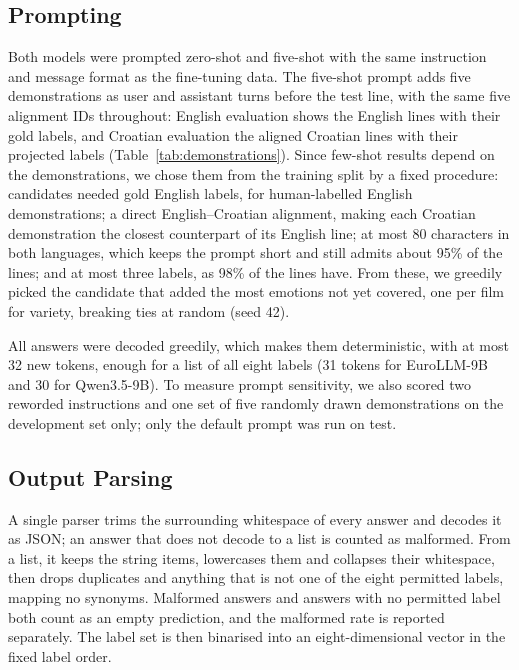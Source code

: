 \subsection{Prompting}
\label{sec:methodology_prompting}

Both models were prompted zero-shot and five-shot with the same instruction and message format as the fine-tuning data. The five-shot prompt adds five demonstrations as user and assistant turns before the test line, with the same five alignment IDs throughout: English evaluation shows the English lines with their gold labels, and Croatian evaluation the aligned Croatian lines with their projected labels (Table~\ref{tab:demonstrations}). Since few-shot results depend on the demonstrations, we chose them from the training split by a fixed procedure: candidates needed gold English labels, for human-labelled English demonstrations; a direct English--Croatian alignment, making each Croatian demonstration the closest counterpart of its English line; at most 80 characters in both languages, which keeps the prompt short and still admits about 95\% of the lines; and at most three labels, as 98\% of the lines have. From these, we greedily picked the candidate that added the most emotions not yet covered, one per film for variety, breaking ties at random (seed 42).

All answers were decoded greedily, which makes them deterministic, with at most 32 new tokens, enough for a list of all eight labels (31 tokens for EuroLLM-9B and 30 for Qwen3.5-9B). To measure prompt sensitivity, we also scored two reworded instructions and one set of five randomly drawn demonstrations on the development set only; only the default prompt was run on test.

\subsection{Output Parsing}
\label{sec:methodology_parsing}

A single parser trims the surrounding whitespace of every answer and decodes it as JSON; an answer that does not decode to a list is counted as malformed. From a list, it keeps the string items, lowercases them and collapses their whitespace, then drops duplicates and anything that is not one of the eight permitted labels, mapping no synonyms. Malformed answers and answers with no permitted label both count as an empty prediction, and the malformed rate is reported separately. The label set is then binarised into an eight-dimensional vector in the fixed label order.
